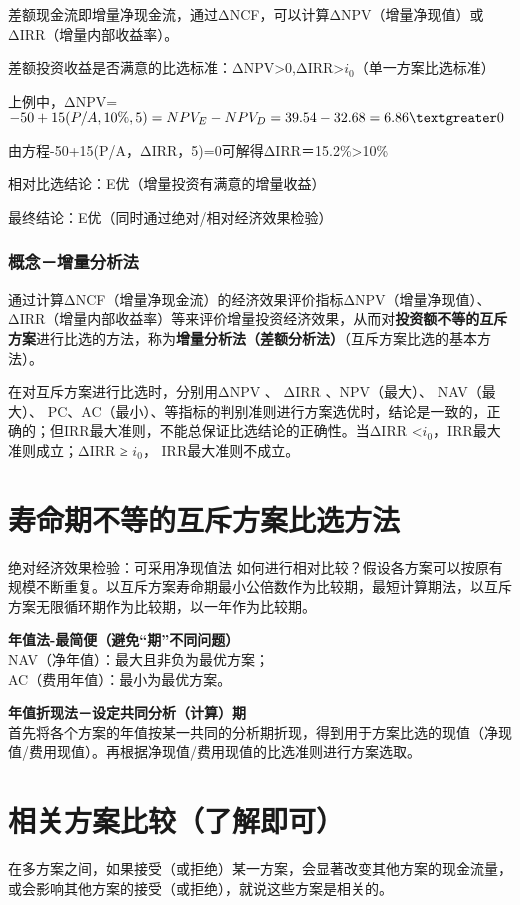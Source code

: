 差额现金流即增量净现金流，通过ΔNCF，可以计算ΔNPV（增量净现值）或ΔIRR（增量内部收益率）。

差额投资收益是否满意的比选标准：ΔNPV>0,ΔIRR>$i_0$（单一方案比选标准）

上例中，ΔNPV=$-50+15(P/A,10\%,5)=NPV_E-NPV_D=39.54-32.68=6.86 \textgreater 0$

由方程-50+15(P/A，ΔIRR，5)=0可解得ΔIRR＝15.2\%>10\%

相对比选结论：E优（增量投资有满意的增量收益）

最终结论：E优（同时通过绝对/相对经济效果检验）

\subsubsection{概念－增量分析法}
通过计算ΔNCF（增量净现金流）的经济效果评价指标ΔNPV（增量净现值）、ΔIRR（增量内部收益率）等来评价增量投资经济效果，从而对\textbf{投资额不等的互斥方案}进行比选的方法，称为\textbf{增量分析法（差额分析法）}（互斥方案比选的基本方法）。

在对互斥方案进行比选时，分别用ΔNPV 、 ΔIRR 、NPV（最大）、 NAV（最大）、 PC、AC（最小）、等指标的判别准则进行方案选优时，结论是一致的，正确的；但IRR最大准则，不能总保证比选结论的正确性。当ΔIRR \textless $i_0$，IRR最大准则成立；ΔIRR ≥ $i_0$， IRR最大准则不成立。

\section{寿命期不等的互斥方案比选方法}
绝对经济效果检验：可采用净现值法
如何进行相对比较？假设各方案可以按原有规模不断重复。以互斥方案寿命期最小公倍数作为比较期，最短计算期法，以互斥方案无限循环期作为比较期，以一年作为比较期。

\textbf{年值法-最简便（避免“期”不同问题）}\\
NAV（净年值）：最大且非负为最优方案；\\
AC（费用年值）：最小为最优方案。

\textbf{年值折现法－设定共同分析（计算）期}\\
首先将各个方案的年值按某一共同的分析期折现，得到用于方案比选的现值（净现值/费用现值）。再根据净现值/费用现值的比选准则进行方案选取。

\section{相关方案比较（了解即可）}
在多方案之间，如果接受（或拒绝）某一方案，会显著改变其他方案的现金流量，或会影响其他方案的接受（或拒绝），就说这些方案是相关的。

